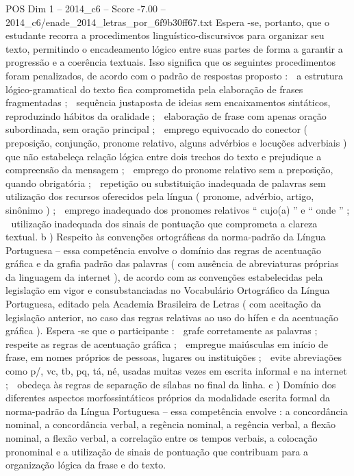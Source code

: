 \begin{textsample}{POS Dim 1 – 2014\_c6 – Score -7.00 – 2014\_c6/enade\_2014\_letras\_por\_6f9b30ff67.txt}
Espera -se, portanto, que o estudante recorra a procedimentos linguístico-discursivos para organizar seu texto, permitindo o encadeamento lógico entre suas partes de forma a garantir a progressão e a coerência textuais.
Isso significa que os seguintes procedimentos foram penalizados, de acordo com o padrão de respostas proposto :  a estrutura lógico-gramatical do texto fica comprometida pela elaboração de frases fragmentadas ;  sequência justaposta de ideias sem encaixamentos sintáticos, reproduzindo hábitos da oralidade ;  elaboração de frase com apenas oração subordinada, sem oração principal ;  emprego equivocado do conector ( preposição, conjunção, pronome relativo, alguns advérbios e locuções adverbiais ) que não estabeleça relação lógica entre dois trechos do texto e prejudique a compreensão da mensagem ;  emprego do pronome relativo sem a preposição, quando obrigatória ;  repetição ou substituição inadequada de palavras sem utilização dos recursos oferecidos pela língua ( pronome, advérbio, artigo, sinônimo ) ;  emprego inadequado dos pronomes relativos “ cujo(a) ” e “ onde ” ;  utilização inadequada dos sinais de pontuação que comprometa a clareza textual. b ) Respeito às convenções ortográficas da norma-padrão da Língua Portuguesa – essa competência envolve o domínio das regras de acentuação gráfica e da grafia padrão das palavras ( com ausência de abreviaturas próprias da linguagem da internet ), de acordo com as convenções estabelecidas pela legislação em vigor e consubstanciadas no Vocabulário Ortográfico da Língua Portuguesa, editado pela Academia Brasileira de Letras ( com aceitação da legislação anterior, no caso das regras relativas ao uso do hífen e da acentuação gráfica ).
Espera -se que o participante :  grafe corretamente as palavras ;  respeite as regras de acentuação gráfica ;  empregue maiúsculas em início de frase, em nomes próprios de pessoas, lugares ou instituições ;  evite abreviações como p/, vc, tb, pq, tá, né, usadas muitas vezes em escrita informal e na internet ;  obedeça às regras de separação de sílabas no final da linha. c ) Domínio dos diferentes aspectos morfossintáticos próprios da modalidade escrita formal da norma-padrão da Língua Portuguesa – essa competência envolve : a concordância nominal, a concordância verbal, a regência nominal, a regência verbal, a flexão nominal, a flexão verbal, a correlação entre os tempos verbais, a colocação pronominal e a utilização de sinais de pontuação que contribuam para a organização lógica da frase e do texto.

\end{textsample}
